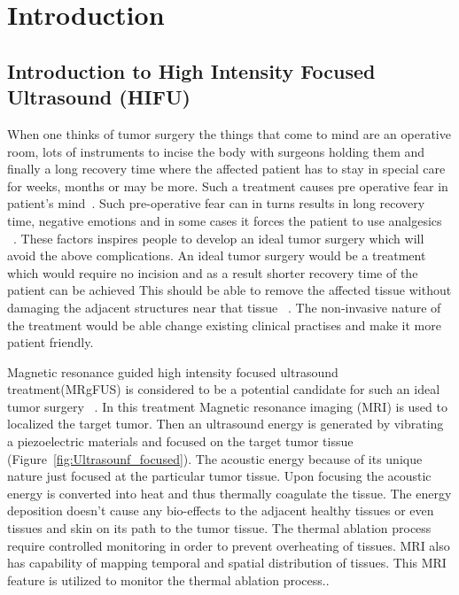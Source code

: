 \chapter{Introduction}
\label{chap:intro}


\section{Introduction to High Intensity Focused Ultrasound (HIFU)}

When one thinks of tumor surgery the things that come to mind are an operative room, lots of instruments to incise the body with surgeons holding them and finally a long recovery time where the affected patient has  to stay in special care for weeks, months or may be more. Such a treatment causes pre operative fear in patient's mind~\cite{Ramsay.1972.A.396}. Such pre-operative fear can in turns results in long recovery time, negative emotions and in some cases it forces the patient to use analgesics ~\cite{Sime1976}. These factors inspires people to develop an ideal tumor surgery which will avoid the above complications. An ideal tumor surgery would be a treatment which would require no incision and as a result shorter recovery time of the patient can be achieved This should be able to remove the affected tissue without damaging the adjacent structures near that tissue ~\cite{Jolesz...1}. The non-invasive nature of the treatment would be able change existing clinical practises and make it more patient friendly.

Magnetic resonance guided high intensity focused ultrasound treatment(MRgFUS) is considered to be a potential candidate for such an ideal tumor surgery ~\cite{Jolesz...1}. In this treatment Magnetic resonance imaging (MRI) is used to localized the target tumor. Then an ultrasound energy is generated by vibrating a piezoelectric materials and focused on the target tumor tissue (Figure~\ref{fig:Ultrasounf_focused}). The acoustic energy because of its unique nature just focused at the particular tumor tissue. Upon focusing the acoustic energy is converted into heat and thus thermally coagulate the tissue. The energy deposition doesn't cause any bio-effects to the adjacent healthy tissues or even tissues and skin on its path to the tumor tissue. The thermal ablation process require controlled monitoring in order to prevent overheating of tissues. MRI also has capability of mapping temporal and spatial distribution of tissues. This MRI feature is utilized to monitor the thermal ablation process..

